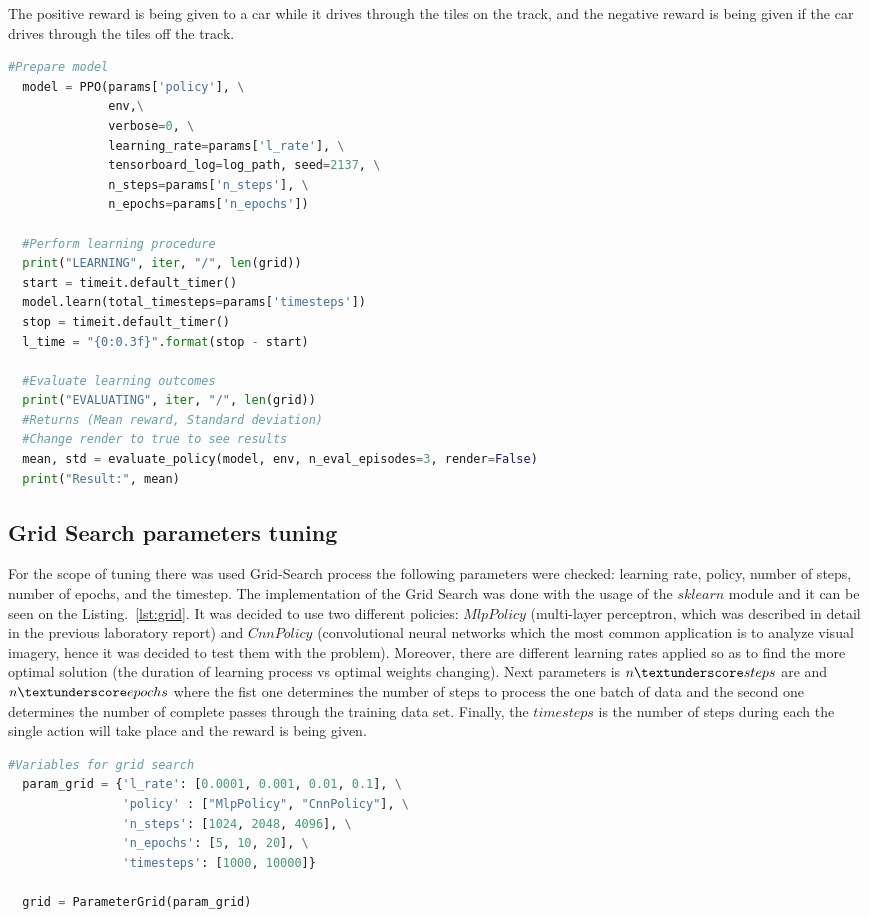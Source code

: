 \documentclass[runningheads]{llncs}
\begin{document}
The positive reward is being given to a car while it drives through the tiles on the track, and the negative reward is being given if the car drives through the tiles off the track.
\begin{lstlisting}[caption={Model creation}, language=Python, label={lst:model}]
  #Prepare model
  model = PPO(params['policy'], \
              env,\
              verbose=0, \
              learning_rate=params['l_rate'], \
              tensorboard_log=log_path, seed=2137, \
              n_steps=params['n_steps'], \
              n_epochs=params['n_epochs'])

  #Perform learning procedure
  print("LEARNING", iter, "/", len(grid))
  start = timeit.default_timer()
  model.learn(total_timesteps=params['timesteps'])
  stop = timeit.default_timer()
  l_time = "{0:0.3f}".format(stop - start)

  #Evaluate learning outcomes
  print("EVALUATING", iter, "/", len(grid))
  #Returns (Mean reward, Standard deviation)
  #Change render to true to see results
  mean, std = evaluate_policy(model, env, n_eval_episodes=3, render=False)
  print("Result:", mean)
\end{lstlisting}


\subsection{Grid Search parameters tuning}
For the scope of tuning there was used Grid-Search process the following parameters were checked:
learning rate, policy, number of steps, number of epochs, and the timestep.
The implementation of the Grid Search was done with the usage of the $sklearn$ module and it can be seen on the Listing.~\ref{lst:grid}. It was decided to use two different policies: $MlpPolicy$ (multi-layer perceptron, which was described in detail in the previous laboratory report) and $CnnPolicy$ (convolutional neural networks which the most common application is to analyze visual imagery, hence it was decided to test them with the problem). Moreover, there are different learning rates applied so as to find the more optimal solution (the duration of learning process vs optimal weights changing). Next parameters is $n\textunderscore steps$ are and $n\textunderscore epochs$ where the fist one determines the number of steps to process the one batch of data and the second one determines the number of complete passes through the training data set. Finally, the $timesteps$ is the number of steps during each the single action will take place and the reward is being given.
\begin{lstlisting}[caption={Grid Seach parameters}, language=Python, label={lst:grid}]
  #Variables for grid search
  param_grid = {'l_rate': [0.0001, 0.001, 0.01, 0.1], \
                'policy' : ["MlpPolicy", "CnnPolicy"], \
                'n_steps': [1024, 2048, 4096], \
                'n_epochs': [5, 10, 20], \
                'timesteps': [1000, 10000]}

  grid = ParameterGrid(param_grid)  
\end{lstlisting}
\end{document}
